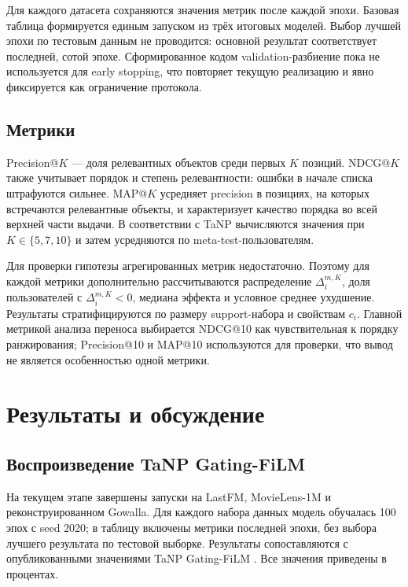 \documentclass[12pt,a4paper]{article}
\begin{document}
Для каждого датасета сохраняются значения метрик после каждой эпохи. Базовая
таблица формируется единым запуском из трёх итоговых моделей. Выбор лучшей
эпохи по тестовым данным не проводится: основной результат соответствует
последней, сотой эпохе. Сформированное кодом validation-разбиение пока не
используется для early stopping, что повторяет текущую реализацию и явно
фиксируется как ограничение протокола.

\subsection{Метрики}

Precision@$K$ --- доля релевантных объектов среди первых $K$ позиций.
NDCG@$K$ также учитывает порядок и степень релевантности: ошибки в
начале списка штрафуются сильнее. MAP@$K$ усредняет precision в позициях, на
которых встречаются релевантные объекты, и характеризует качество порядка во
всей верхней части выдачи. В соответствии с TaNP вычисляются значения при
$K\in\{5,7,10\}$ и затем усредняются по meta-test-пользователям.

Для проверки гипотезы агрегированных метрик недостаточно. Поэтому для каждой
метрики дополнительно рассчитываются распределение $\Delta_i^{m,K}$, доля
пользователей с $\Delta_i^{m,K}<0$, медиана эффекта и условное среднее
ухудшение. Результаты стратифицируются по размеру support-набора и свойствам
$c_i$. Главной метрикой анализа переноса выбирается NDCG@10 как чувствительная
к порядку ранжирования; Precision@10 и MAP@10 используются для проверки, что
вывод не является особенностью одной метрики.

\section{Результаты и обсуждение}
\subsection{Воспроизведение TaNP Gating-FiLM}

На текущем этапе завершены запуски на LastFM, MovieLens-1M и реконструированном
Gowalla. Для каждого
набора данных модель обучалась 100 эпох с seed 2020; в таблицу включены
метрики последней эпохи, без выбора лучшего результата по тестовой выборке.
Результаты сопоставляются с опубликованными значениями TaNP Gating-FiLM
\citep{lin2021tanp}. Все значения приведены в процентах.
\end{document}
